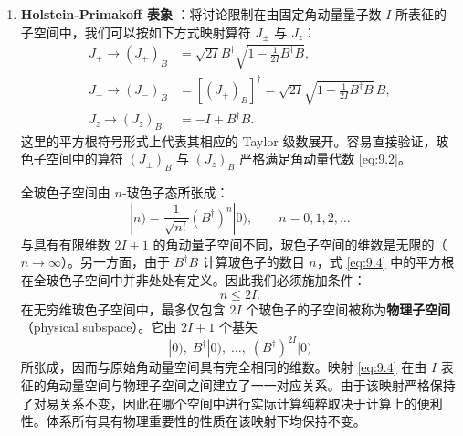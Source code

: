 \begin{enumerate}
\item \textbf{Holstein-Primakoff 表象} \cite{HP40}：将讨论限制在由固定角动量量子数 $I$ 所表征的子空间中，我们可以按如下方式映射算符
$J_{\pm}$ 与 $J_{z}$：
\begin{align}
J_{+}\to(J_{+})_{B} & =\sqrt{2I}B^{\dagger}\sqrt{1-\frac{1}{2I}B^{\dagger}B},\nonumber \\
J_{-}\to(J_{-})_{B} & =\left[(J_{+})_{B}\right]^{\dagger}=\sqrt{2I}\sqrt{1-\frac{1}{2I}B^{\dagger}B}\,B,\label{eq:9.4}\\
J_{z}\to(J_{z})_{B} & =-I+B^{\dagger}B.\nonumber 
\end{align}
这里的平方根符号形式上代表其相应的 Taylor 级数展开。容易直接验证，玻色子空间中的算符 $(J_{\pm})_{B}$ 与
$(J_{z})_{B}$ 严格满足角动量代数 \ref{eq:9.2}。

全玻色子空间由 $n$-玻色子态所张成：
\begin{equation}
|n)=\frac{1}{\sqrt{n!}}(B^{\dagger})^{n}|0),\qquad n=0,1,2,\ldots\label{eq:9.5}
\end{equation}
与具有有限维数 $2I+1$ 的角动量子空间不同，玻色子空间的维数是无限的（$n\to\infty$）。另一方面，由于 $B^{\dagger}B$
计算玻色子的数目 $n$，式 \ref{eq:9.4} 中的平方根在全玻色子空间中并非处处有定义。因此我们必须施加条件：
\begin{equation}
n\le2I.\label{eq:9.6}
\end{equation}
在无穷维玻色子空间中，最多仅包含 $2I$ 个玻色子的子空间被称为\textbf{物理子空间}（physical subspace）。它由
$2I+1$ 个基矢
\begin{equation}
|0),\;B^{\dagger}|0),\;\ldots,\;(B^{\dagger})^{2I}|0)\label{eq:9.7}
\end{equation}
所张成，因而与原始角动量空间具有完全相同的维数。映射 \ref{eq:9.4} 在由 $I$ 表征的角动量空间与物理子空间之间建立了一一对应关系。由于该映射严格保持了对易关系不变，因此在哪个空间中进行实际计算纯粹取决于计算上的便利性。体系所有具有物理重要性的性质在该映射下均保持不变。


\end{enumerate}
